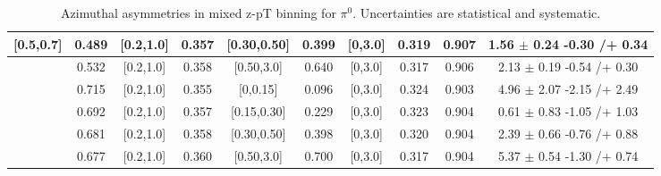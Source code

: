 \begin{table}[H]
\begin{tabular}{|c| c| c| c| c| c| c| c| c| c|}
[0.5,0.7]	&	0.489	&	[0.2,1.0]	&	0.357	&	[0.30,0.50]	&	0.399	&	[0,3.0]	&	0.319	&	0.907	&	1.56	$\pm$ 	0.24	-0.30	/+	0.34	\\ \hline
[0.5,0.7]	&	0.532	&	[0.2,1.0]	&	0.358	&	[0.50,3.0]	&	0.640	&	[0,3.0]	&	0.317	&	0.906	&	2.13	$\pm$ 	0.19	-0.54	/+	0.30	\\ \hline
 \hline
[0.7,1.0]	&	0.715	&	[0.2,1.0]	&	0.355	&	[0,0.15]	&	0.096	&	[0,3.0]	&	0.324	&	0.903	&	4.96	$\pm$ 	2.07	-2.15	/+	2.49	\\ \hline
[0.7,1.0]	&	0.692	&	[0.2,1.0]	&	0.357	&	[0.15,0.30]	&	0.229	&	[0,3.0]	&	0.323	&	0.904	&	0.61	$\pm$ 	0.83	-1.05	/+	1.03	\\ \hline
[0.7,1.0]	&	0.681	&	[0.2,1.0]	&	0.358	&	[0.30,0.50]	&	0.398	&	[0,3.0]	&	0.320	&	0.904	&	2.39	$\pm$ 	0.66	-0.76	/+	0.88	\\ \hline
[0.7,1.0]	&	0.677	&	[0.2,1.0]	&	0.360	&	[0.50,3.0]	&	0.700	&	[0,3.0]	&	0.317	&	0.904	&	5.37	$\pm$ 	0.54	-1.30	/+	0.74	\\ \hline
\end{tabular}
\caption{Azimuthal asymmetries in mixed z-pT binning for $\pi^0$. Uncertainties are statistical and systematic.}
\label{tab:finalpi0ptbins}
\end{table}

